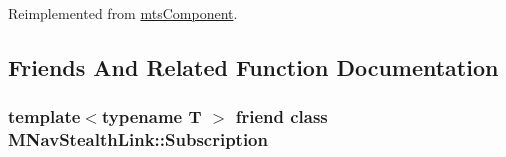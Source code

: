 Reimplemented from \hyperlink{classmts_component_aaf28f0262b44eb6866e10089a02fa6e4}{mts\-Component}.



\subsection{Friends And Related Function Documentation}
\hypertarget{classmts_medtronic_stealthlink_a4366be00dfae3e97b5db855f73f8e36b}{
\subsubsection[{M\-Nav\-Stealth\-Link\-::\-Subscription}]{\setlength{\rightskip}{0pt plus 5cm}template$<$typename T $>$ friend class {\bf M\-Nav\-Stealth\-Link\-::\-Subscription}\hspace{0.3cm}{\ttfamily [friend]}}}\label{classmts_medtronic_stealthlink_a4366be00dfae3e97b5db855f73f8e36b}


